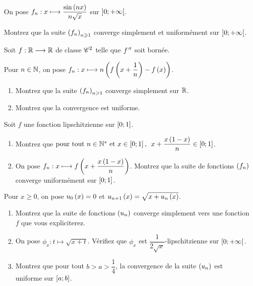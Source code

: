 \begin{exoss}
On pose \(f_n:x\longmapsto\dfrac{\sin\left(nx\right)}{n\sqrt{x}}\) sur \(\left]0;+\infty\right[\).

Montrez que la suite \(\left(f_n\right)_{n\geqslant1}\) converge simplement et uniformément sur \(\left]0;+\infty\right[\).
\end{exoss}

\begin{exoss}
Soit \(f:\mathbb{R}\longrightarrow\mathbb{R}\) de classe \(\mathscr{C}^{2}\) telle que \(f^{\,\prime\prime}\) soit bornée.

Pour \(n\in\mathbb{N}\), on pose \(f_n:x\longmapsto n\left(f\left(x+\dfrac{1}{n}\right)-f\left(x\right)\right)\).

\begin{enumerate}
    \item Montrez que la suite \(\left(f_n\right)_{n\geqslant1}\) converge simplement sur \(\mathbb{R}\). \\
    \item Montrez que la convergence est uniforme.
\end{enumerate}
\end{exoss}

\begin{exoss}
Soit \(f\) une fonction lipschitzienne sur \(\left[0;1\right]\).

\begin{enumerate}
    \item Montrez que \(\quantifs{\tpt n\in\Ns\text{ et }x\in\intervii{0}{1}}x+\dfrac{x\paren{1-x}}{n}\in\intervii{0}{1}\). \\
    \item On pose \(f_n:x\longmapsto f\left(x+\dfrac{x\left(1-x\right)}{n}\right)\). Montrez que la suite de fonctions \(\left(f_n\right)\) converge uniformément sur \(\left[0;1\right]\).
\end{enumerate}
\end{exoss}

\begin{exoss}
Pour \(x\geq0\), on pose \(u_0\left(x\right)=0\) et \(u_{n+1}\left(x\right)=\sqrt{x+u_n\left(x\right)}\).

\begin{enumerate}
    \item Montrez que la suite de fonctions \(\left(u_n\right)\) converge simplement vers une fonction \(f\) que vous expliciterez. \\
    \item On pose \(\phi_x:t\mapsto\sqrt{x+t}\). Vérifiez que \(\phi_x\) est \(\dfrac{1}{2\sqrt{x}}\)-lipschitzienne sur \(\left[0;+\infty\right[\). \\
    \item Montrez que pour tout \(b>a>\dfrac{1}{4}\), la convergence de la suite \(\left(u_n\right)\) est uniforme sur \(\left[a;b\right]\).
\end{enumerate}
\end{exoss}

